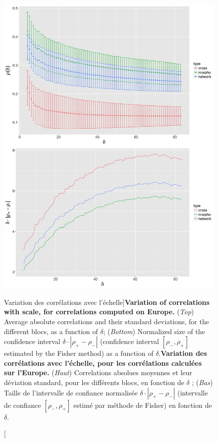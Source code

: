 \begin{figure}
\includegraphics[width=\linewidth,height=0.85\textheight]{Figures/Final/4-1-3-fig-staticcorrs-corrsdistrib}
\caption[Variation of correlations with scale][Variation des corrélations avec l'échelle]{\textbf{Variation of correlations with scale, for correlations computed on Europe.} (\textit{Top}) Average absolute correlations and their standard deviations, for the different blocs, as a function of $\delta$; (\textit{Bottom}) Normalized size of the confidence interval $\delta\cdot \left|\rho_{+} - \rho_{-}\right|$ (confidence interval $\left[\rho_{-} , \rho_{+}\right]$ estimated by the Fisher method) as a function of $\delta$.\label{fig:staticcorrs:corrsdistrib}}{\textbf{Variation des corrélations avec l'échelle, pour les corrélations calculées sur l'Europe.} (\textit{Haut}) Correlations absolues moyennes et leur déviation standard, pour les différents blocs, en fonction de $\delta$ ; (\textit{Bas}) Taille de l'intervalle de confiance normalisée $\delta\cdot \left|\rho_{+} - \rho_{-}\right|$ (intervalle de confiance $\left[\rho_{-} , \rho_{+}\right]$ estimé par méthode de Fisher) en fonction de $\delta$.\label{fig:staticcorrs:corrsdistrib}}
\end{figure}



